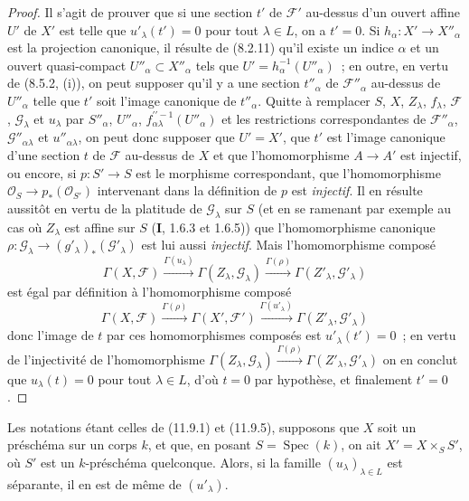 \begin{proof}
Il s'agit de prouver que si une section $t'$ de $\mathcal F'$ au-dessus d'un
ouvert affine $U'$ de $X'$ est telle que $u'_\lambda(t')=0$ pour tout
$\lambda\in L$, on a $t'=0$. Si $h_\alpha:X'\to X''_\alpha$ est la projection
canonique, il résulte de (8.2.11) qu'il existe un indice $\alpha$ et un ouvert
quasi-compact $U''_\alpha\subset X''_\alpha$ tels que
$U'=h_\alpha^{-1}(U''_\alpha)$~; en outre, en vertu de (8.5.2, (i)), on peut
supposer qu'il y a une section $t''_\alpha$ de $\mathcal F''_\alpha$ au-dessus
de $U''_\alpha$ telle que $t'$ soit l'image canonique de $t''_\alpha$. Quitte à
remplacer $S$, $X$, $Z_\lambda$, $f_\lambda$, $\mathcal F$,
$\mathcal G_\lambda$ et $u_\lambda$ par $S''_\alpha$, $U''_\alpha$,
$f^{\prime\prime-1}_{\alpha\lambda}(U''_\alpha)$ et les restrictions correspondantes
de $\mathcal F''_\alpha$, $\mathcal G''_{\alpha\lambda}$ et
$u''_{\alpha\lambda}$, on peut donc supposer que $U'=X'$, que $t'$ est
l'image canonique d'une section $t$ de $\mathcal F$ au-dessus de $X$ et que
l'homomorphisme $A\to A'$ est injectif, ou encore, si $p:S'\to S$ est le
morphisme correspondant, que l'homomorphisme
$\mathcal O_S\to p_*(\mathcal O_{S'})$ intervenant dans la définition de $p$
est \emph{injectif}. Il en résulte aussitôt en vertu de la platitude de
$\mathcal G_\lambda$ sur $S$ (et en se ramenant par exemple au cas où
$Z_\lambda$ est affine sur $S$ (\textbf I, 1.6.3 et 1.6.5)) que
l'homomorphisme canonique
$\rho:\mathcal G_\lambda\to(g'_\lambda)_*(\mathcal G'_\lambda)$ est lui aussi
\emph{injectif}. Mais l'homomorphisme composé
\[
\Gamma(X,\mathcal F)\xrightarrow{\Gamma(u_\lambda)}
\Gamma(Z_\lambda,\mathcal G_\lambda)\xrightarrow{\Gamma(\rho)}
\Gamma(Z'_\lambda,\mathcal G'_\lambda)
\]
est égal par définition à l'homomorphisme composé
\[
\Gamma(X,\mathcal F)\xrightarrow{\Gamma(\rho)}
\Gamma(X',\mathcal F')\xrightarrow{\Gamma(u'_\lambda)}
\Gamma(Z'_\lambda,\mathcal G'_\lambda)
\]
donc l'image de $t$ par ces homomorphismes composés est
$u'_\lambda(t')=0$~; en vertu de l'injectivité de l'homomorphisme
$\Gamma(Z_\lambda,\mathcal G_\lambda)\xrightarrow{\Gamma(\rho)}
\Gamma(Z'_\lambda,\mathcal G'_\lambda)$ on en conclut que $u_\lambda(t)=0$
pour tout $\lambda\in L$, d'où $t=0$ par hypothèse, et finalement $t'=0$.
\end{proof}

\begin{proposition}[11.9.13]
\label{IV.11.9.13-fr}
Les notations étant celles de \textup{(11.9.1)} et \textup{(11.9.5)}, supposons que $X$ soit un
préschéma sur un corps $k$, et que, en posant $S=\operatorname{Spec}(k)$, on
ait $X'=X\times_S S'$, où $S'$ est un $k$-préschéma quelconque. Alors, si la
famille $(u_\lambda)_{\lambda\in L}$ est séparante, il en est de même de
$(u'_\lambda)$.
\end{proposition}

